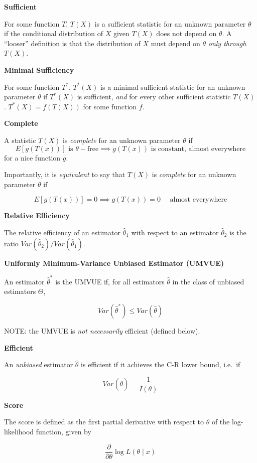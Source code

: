 \documentclass[
  letterpaper,
  DIV=11,
  numbers=noendperiod]{scrreprt}
\begin{document}
\textbf{Sufficient}

For some function \(T\), \(T(X)\) is a sufficient statistic for an
unknown parameter \(\theta\) if the conditional distribution of \(X\)
given \(T(X)\) does not depend on \(\theta\). A ``looser'' definition is
that the distribution of \(X\) must depend on \(\theta\) \emph{only
through} \(T(X)\).

\textbf{Minimal Sufficiency}

For some function \(T^*\), \(T^*(X)\) is a minimal sufficient statistic
for an unknown parameter \(\theta\) if \(T^*(X)\) is sufficient,
\emph{and} for every other sufficient statistic \(T(X)\).
\(T^*(X) = f(T(X))\) for some function \(f\).

\textbf{Complete}

A statistic \(T(X)\) is \emph{complete} for an unknown parameter
\(\theta\) if \[
E[g(T(x))] \text{ is } \theta-\text{free} \implies g(T(x)) \text{ is constant, almost everywhere}
\] for a nice function \(g\).

Importantly, it is \emph{equivalent} to say that \(T(X)\) is
\emph{complete} for an unknown parameter \(\theta\) if

\[
E[g(T(x))] = 0 \implies g(T(x)) = 0 \quad\text{ almost everywhere}
\]

\textbf{Relative Efficiency}

The relative efficiency of an estimator \(\hat{\theta}_1\) with respect
to an estimator \(\hat{\theta}_2\) is the ratio
\(Var(\hat{\theta}_2)/Var(\hat{\theta}_1)\).

\textbf{Uniformly Minimum-Variance Unbiased Estimator (UMVUE)}

An estimator \(\hat{\theta}^*\) is the UMVUE if, for all estimators
\(\hat{\theta}\) in the class of unbiased estimators \(\Theta\),

\[
Var(\hat{\theta}^*) \leq Var(\hat{\theta})
\]

NOTE: the UMVUE is \emph{not necessarily} efficient (defined below).

\textbf{Efficient}

An \emph{unbiased} estimator \(\hat{\theta}\) is efficient if it
achieves the C-R lower bound, i.e.~if

\[
Var(\hat{\theta}) = \frac{1}{I(\theta)}
\]

\textbf{Score}

The score is defined as the first partial derivative with respect to
\(\theta\) of the log-likelihood function, given by

\[
\frac{\partial}{\partial \theta} \log L(\theta \mid x)
\]
\end{document}
